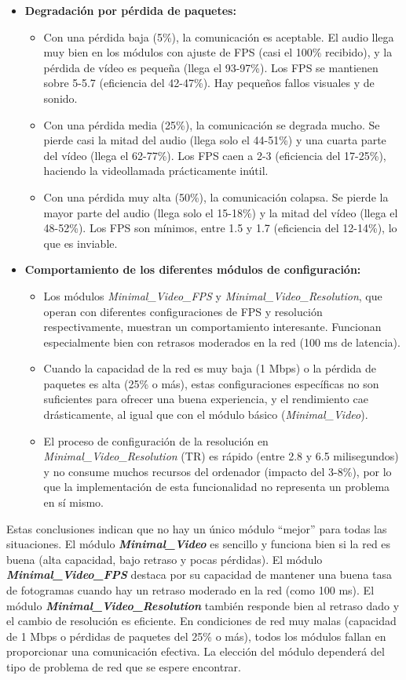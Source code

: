 \begin{itemize}
\item \textbf{Degradación por pérdida de paquetes:}
\begin{itemize}
    \item Con una pérdida baja (5\%), la comunicación es aceptable. El audio llega muy bien en los módulos con ajuste de FPS (casi el 100\% recibido), y la pérdida de vídeo es pequeña (llega el 93-97\%). Los FPS se mantienen sobre 5-5.7 (eficiencia del 42-47\%). Hay pequeños fallos visuales y de sonido.
    \item Con una pérdida media (25\%), la comunicación se degrada mucho. Se pierde casi la mitad del audio (llega solo el 44-51\%) y una cuarta parte del vídeo (llega el 62-77\%). Los FPS caen a 2-3 (eficiencia del 17-25\%), haciendo la videollamada prácticamente inútil.
    \item Con una pérdida muy alta (50\%), la comunicación colapsa. Se pierde la mayor parte del audio (llega solo el 15-18\%) y la mitad del vídeo (llega el 48-52\%). Los FPS son mínimos, entre 1.5 y 1.7 (eficiencia del 12-14\%), lo que es inviable.
\end{itemize}

\item \textbf{Comportamiento de los diferentes módulos de configuración:}
\begin{itemize}
    \item Los módulos \textit{Minimal\_Video\_FPS} y \textit{Minimal\_Video\_Resolution}, que operan con diferentes configuraciones de FPS y resolución respectivamente, muestran un comportamiento interesante. Funcionan especialmente bien con retrasos moderados en la red (100 ms de latencia).
    \item Cuando la capacidad de la red es muy baja (1 Mbps) o la pérdida de paquetes es alta (25\% o más), estas configuraciones específicas no son suficientes para ofrecer una buena experiencia, y el rendimiento cae drásticamente, al igual que con el módulo básico (\textit{Minimal\_Video}).
    \item El proceso de configuración de la resolución en \textit{Minimal\_Video\_Resolution} (TR) es rápido (entre 2.8 y 6.5 milisegundos) y no consume muchos recursos del ordenador (impacto del 3-8\%), por lo que la implementación de esta funcionalidad no representa un problema en sí mismo.
\end{itemize}
\end{itemize}

Estas conclusiones indican que no hay un único módulo ``mejor'' para todas las situaciones.
El módulo \textbf{\textit{Minimal\_Video}} es sencillo y funciona bien si la red es buena (alta capacidad, bajo retraso y pocas pérdidas).
El módulo \textbf{\textit{Minimal\_Video\_FPS}} destaca por su capacidad de mantener una buena tasa de fotogramas cuando hay un retraso moderado en la red (como 100 ms).
El módulo \textbf{\textit{Minimal\_Video\_Resolution}} también responde bien al retraso dado y el cambio de resolución es eficiente.
En condiciones de red muy malas (capacidad de 1 Mbps o pérdidas de paquetes del 25\% o más), todos los módulos fallan en proporcionar una comunicación efectiva. La elección del módulo dependerá del tipo de problema de red que se espere encontrar.

